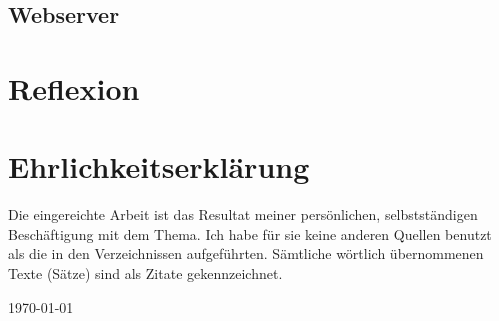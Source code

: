 \documentclass[12pt,a4paper]{report}
\begin{document}
\section{Webserver}




\chapter{Reflexion}
\label{ch:reflexion}

\clearpage
{}
{}
\nocite{*}



\clearpage
{}
{}

\listoffigures

\appendix


\chapter*{Ehrlichkeitserklärung}

Die eingereichte Arbeit ist das Resultat meiner persönlichen, selbstständigen Beschäftigung mit dem Thema.
Ich habe für sie keine anderen Quellen benutzt als die in den Verzeichnissen aufgeführten.
Sämtliche wörtlich übernommenen Texte (Sätze) sind als Zitate gekennzeichnet.

\vspace{2cm}
\today
\end{document}
